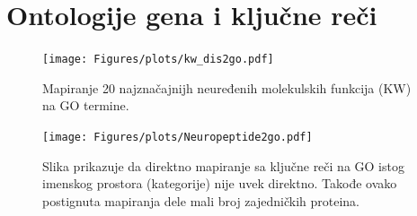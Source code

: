 \section{Ontologije gena i ključne reči}

\begin{figure}[th]
\hspace*{-2.2cm} 
\texttt{[image: Figures/plots/kw\_dis2go.pdf]}
\decoRule
\caption {
  Mapiranje 20 najznačajnijh neuređenih molekulskih funkcija (KW) \parencite{Xie2007} 
  na GO termine.
}
\label{fig:KWtop20dis}
\end{figure}


\begin{figure}[th]
\centering
\hspace*{-2.2cm} 
\texttt{[image: Figures/plots/Neuropeptide2go.pdf]}
\decoRule
\caption {
  Slika prikazuje da direktno mapiranje sa ključne reči na GO istog imenskog prostora (kategorije) nije uvek direktno.
  Takođe ovako postignuta mapiranja dele mali broj zajedničkih proteina.
}
\label{fig:KWtop20dis}
\end{figure}
